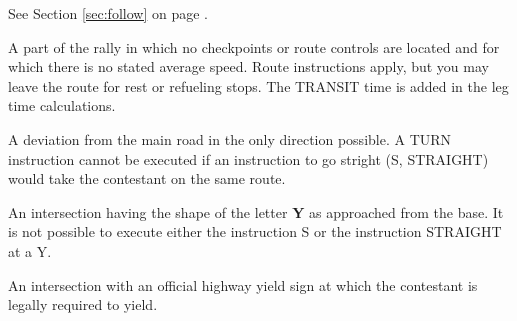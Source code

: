 See Section \ref{sec:follow} on page \pageref{sec:follow}.

A part of the rally in which no checkpoints or route controls are located and for which there is no stated average speed.  Route instructions apply, but you may leave the route for rest or refueling stops.  The TRANSIT time is added in the leg time calculations.

A deviation from the main road in the only direction possible.  A TURN instruction cannot be executed if an instruction to go stright (S, STRAIGHT) would take the contestant on the same route.

An intersection having the shape of the letter \textbf{Y} as approached from the base.  It is not possible to execute either the instruction S or the instruction STRAIGHT at a Y.

An intersection with an official highway yield sign at which the contestant is legally required to yield.

